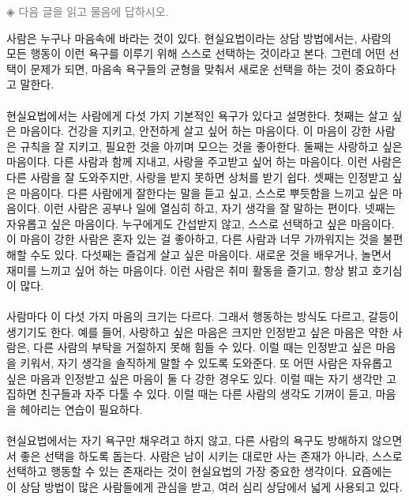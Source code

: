 \documentclass[10pt,a4paper]{article}
\begin{document}
\vspace{4mm}
{\small\textcolor{gray}{◈ 다음 글을 읽고 물음에 답하시오.}}
\vspace{2mm}
\begin{tcolorbox}[passage]
사람은 누구나 마음속에 바라는 것이 있다. 현실요법이라는 상담 방법에서는, 사람의 모든 행동이 이런 욕구를 이루기 위해 스스로 선택하는 것이라고 본다. 그런데 어떤 선택이 문제가 되면, 마음속 욕구들의 균형을 맞춰서 새로운 선택을 하는 것이 중요하다고 말한다. \\{}
\vspace{4pt} \\{}
현실요법에서는 사람에게 다섯 가지 기본적인 욕구가 있다고 설명한다. 첫째는 살고 싶은 마음이다. 건강을 지키고, 안전하게 살고 싶어 하는 마음이다. 이 마음이 강한 사람은 규칙을 잘 지키고, 필요한 것을 아끼며 모으는 것을 좋아한다. 둘째는 사랑하고 싶은 마음이다. 다른 사람과 함께 지내고, 사랑을 주고받고 싶어 하는 마음이다. 이런 사람은 다른 사람을 잘 도와주지만, 사랑을 받지 못하면 상처를 받기 쉽다. 셋째는 인정받고 싶은 마음이다. 다른 사람에게 잘한다는 말을 듣고 싶고, 스스로 뿌듯함을 느끼고 싶은 마음이다. 이런 사람은 공부나 일에 열심히 하고, 자기 생각을 잘 말하는 편이다. 넷째는 자유롭고 싶은 마음이다. 누구에게도 간섭받지 않고, 스스로 선택하고 싶은 마음이다. 이 마음이 강한 사람은 혼자 있는 걸 좋아하고, 다른 사람과 너무 가까워지는 것을 불편해할 수도 있다. 다섯째는 즐겁게 살고 싶은 마음이다. 새로운 것을 배우거나, 놀면서 재미를 느끼고 싶어 하는 마음이다. 이런 사람은 취미 활동을 즐기고, 항상 밝고 호기심이 많다. \\{}
\vspace{4pt} \\{}
사람마다 이 다섯 가지 마음의 크기는 다르다. 그래서 행동하는 방식도 다르고, 갈등이 생기기도 한다. 예를 들어, 사랑하고 싶은 마음은 크지만 인정받고 싶은 마음은 약한 사람은, 다른 사람의 부탁을 거절하지 못해 힘들 수 있다. 이럴 때는 인정받고 싶은 마음을 키워서, 자기 생각을 솔직하게 말할 수 있도록 도와준다. 또 어떤 사람은 자유롭고 싶은 마음과 인정받고 싶은 마음이 둘 다 강한 경우도 있다. 이럴 때는 자기 생각만 고집하면 친구들과 자주 다툴 수 있다. 이럴 때는 다른 사람의 생각도 기꺼이 듣고, 마음을 헤아리는 연습이 필요하다. \\{}
\vspace{4pt} \\{}
현실요법에서는 자기 욕구만 채우려고 하지 않고, 다른 사람의 욕구도 방해하지 않으면서 좋은 선택을 하도록 돕는다. 사람은 남이 시키는 대로만 사는 존재가 아니라, 스스로 선택하고 행동할 수 있는 존재라는 것이 현실요법의 가장 중요한 생각이다. 요즘에는 이 상담 방법이 많은 사람들에게 관심을 받고, 여러 심리 상담에서 넓게 사용되고 있다.
\end{tcolorbox}
\end{document}
